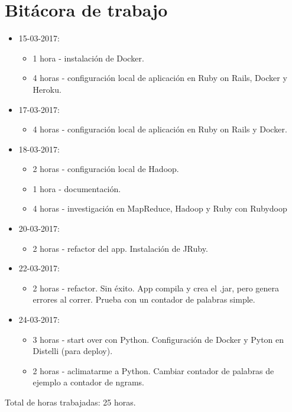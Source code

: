 \documentclass{article}
\begin{document}
\section{Bit\'acora de trabajo}
\begin{itemize}
  \item 15-03-2017:
  \begin{itemize}
    \item 1 hora - instalaci\'on de Docker.
    \item 4 horas - configuraci\'on local de aplicaci\'on en Ruby on Rails, Docker y Heroku.
  \end{itemize}
  \item 17-03-2017:
  \begin{itemize}
    \item 4 horas - configuraci\'on local de aplicaci\'on en Ruby on Rails y Docker.
  \end{itemize}
  \item 18-03-2017:
  \begin{itemize}
    \item 2 horas - configuraci\'on local de Hadoop.
    \item 1 hora - documentaci\'on.
    \item 4 horas - investigaci\'on en MapReduce, Hadoop y Ruby con Rubydoop
  \end{itemize}
  \item 20-03-2017:
  \begin{itemize}
    \item 2 horas - refactor del app. Instalaci\'on de JRuby.
  \end{itemize}
  \item 22-03-2017:
  \begin{itemize}
    \item 2 horas - refactor. Sin \'exito. App compila y crea el .jar, pero genera errores al correr. Prueba con un contador de palabras simple.
  \end{itemize}
  \item 24-03-2017:
  \begin{itemize}
    \item 3 horas - start over con Python. Configuraci\'on de Docker y Pyton en Distelli (para deploy).
    \item 2 horas - aclimatarme a Python. Cambiar contador de palabras de ejemplo a contador de ngrams.
  \end{itemize}
\end{itemize}
Total de horas trabajadas: 25 horas.
\end{document}

